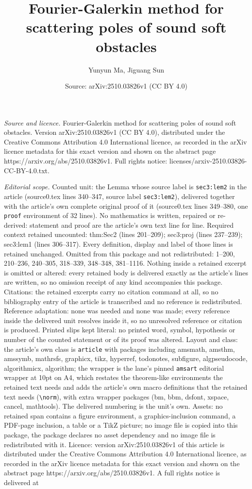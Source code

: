 \documentclass[10pt,a4paper]{amsart}
\title[Fourier-Galerkin method for scattering poles of sound soft o]{Fourier-Galerkin method for scattering poles of sound soft obstacles}
\author{Yunyun Ma, Jiguang Sun}
\date{Source: arXiv:2510.03826v1 (CC BY 4.0)}
\begin{document}
\maketitle

\noindent\emph{Source and licence.} Fourier-Galerkin method for scattering poles of sound soft obstacles. Version arXiv:2510.03826v1 (CC BY 4.0), distributed under the Creative Commons Attribution 4.0 International licence, as recorded in the arXiv licence metadata for this exact version and shown on the abstract page https://arxiv.org/abs/2510.03826v1. Full rights notice: licenses/arxiv-2510.03826-CC-BY-4.0.txt.\par\smallskip

\noindent\textit{Editorial scope.} Counted unit: the Lemma whose source label is \texttt{sec3:lem2} in the article (source0.tex lines 340--347, source label \texttt{sec3:lem2}), delivered together with the article's own complete original proof of it (source0.tex lines 349--380, one \texttt{proof} environment of 32 lines). No mathematics is written, repaired or re-derived: statement and proof are the article's own text line for line. Required context retained uncounted: thm:Sec2 (lines 201--209); sec3:proj (lines 237--239); sec3:lem1 (lines 306--317). Every definition, display and label of those lines is retained unchanged. Omitted from this package and not redistributed: 1--200, 210--236, 240--305, 318--339, 348--348, 381--1116. Nothing inside a retained excerpt is omitted or altered: every retained body is delivered exactly as the article's lines are written, so no omission receipt of any kind accompanies this package. Citations: the retained excerpts carry no citation command at all, so no bibliography entry of the article is transcribed and no reference is redistributed. Reference adaptation: none was needed and none was made; every reference inside the delivered unit resolves inside it, so no unresolved reference or citation is produced. Printed slips kept literal: no printed word, symbol, hypothesis or number of the counted statement or of its proof was altered. Layout and class: the article's own class is \texttt{article} with packages including amsmath, amsthm, amssymb, mathrsfs, graphicx, tikz, hyperref, todonotes, subfigure, algpseudocode, algorithmicx, algorithm; the wrapper is the lane's pinned \texttt{amsart} editorial wrapper at 10pt on A4, which restates the theorem-like environments the retained text needs and adds the article's own macro definitions that the retained text needs (\texttt{\textbackslash norm}), with extra wrapper packages (bm, bbm, dsfont, xspace, cancel, mathtools). The delivered numbering is the unit's own. Assets: no retained span contains a figure environment, a graphics-inclusion command, a PDF-page inclusion, a table or a TikZ picture; no image file is copied into this package, the package declares no asset dependency and no image file is redistributed with it. Licence: version arXiv:2510.03826v1 of this article is distributed under the Creative Commons Attribution 4.0 International licence, as recorded in the arXiv licence metadata for this exact version and shown on the abstract page https://arxiv.org/abs/2510.03826v1. A full rights notice is delivered at 
\end{document}
